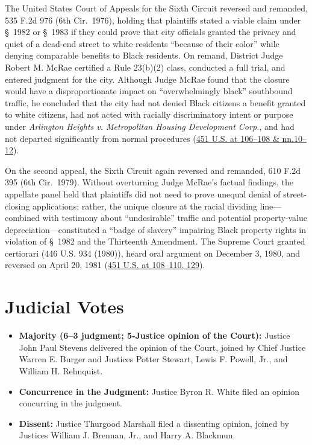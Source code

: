 \documentclass[12pt]{article}
\begin{document}
The United States Court of Appeals for the Sixth Circuit reversed and remanded, 535 F.2d 976 (6th Cir.\ 1976), holding that plaintiffs stated a viable claim under \S~1982 or \S~1983 if they could prove that city officials granted the privacy and quiet of a dead-end street to white residents ``because of their color'' while denying comparable benefits to Black residents. On remand, District Judge Robert M. McRae certified a Rule 23(b)(2) class, conducted a full trial, and entered judgment for the city. Although Judge McRae found that the closure would have a disproportionate impact on ``overwhelmingly black'' southbound traffic, he concluded that the city had not denied Black citizens a benefit granted to white citizens, had not acted with racially discriminatory intent or purpose under \textit{Arlington Heights v. Metropolitan Housing Development Corp.}, and had not departed significantly from normal procedures (\href{https://supreme.justia.com/cases/federal/us/451/100/}{451 U.S. at 106--108 \& nn.10--12}).

On the second appeal, the Sixth Circuit again reversed and remanded, 610 F.2d 395 (6th Cir.\ 1979). Without overturning Judge McRae's factual findings, the appellate panel held that plaintiffs did not need to prove unequal denial of street-closing applications; rather, the unique closure at the racial dividing line---combined with testimony about ``undesirable'' traffic and potential property-value depreciation---constituted a ``badge of slavery'' impairing Black property rights in violation of \S~1982 and the Thirteenth Amendment. The Supreme Court granted certiorari (446 U.S. 934 (1980)), heard oral argument on December 3, 1980, and reversed on April 20, 1981 (\href{https://supreme.justia.com/cases/federal/us/451/100/}{451 U.S. at 108--110, 129}).

\section{Judicial Votes}

\begin{itemize}
  \item \textbf{Majority (6--3 judgment; 5-Justice opinion of the Court):} Justice John Paul Stevens delivered the opinion of the Court, joined by Chief Justice Warren E. Burger and Justices Potter Stewart, Lewis F. Powell, Jr., and William H. Rehnquist.
  \item \textbf{Concurrence in the Judgment:} Justice Byron R. White filed an opinion concurring in the judgment.
  \item \textbf{Dissent:} Justice Thurgood Marshall filed a dissenting opinion, joined by Justices William J. Brennan, Jr., and Harry A. Blackmun.
\end{itemize}
\end{document}
